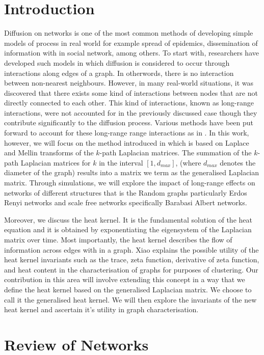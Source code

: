 \documentclass[10pt,a4paper]{article}
\theoremstyle{plain}
\theoremstyle{definition}
\begin{document}
	\newpage
	\section*{Introduction}
	Diffusion on networks is one of the most common methods of developing simple models of process in real world for example spread of epidemics, dissemination of information with in social network, among others. To start with, researchers have developed such models in which diffusion is considered to occur through interactions along edges of a graph. In otherwords, there is no interaction between non-nearest neighbours. However, in many real-world situations, it was discovered that there exists some kind of interactions between nodes that are not directly connected to each other. This kind of interactions, known as long-range interactions, were not accounted for in the previously discussed case though they contribute significantly to the diffusion process. Various methods have been put forward to account for these long-range range interactions as in . In this work, however, we will focus on the method introduced in \citep{estrada2012path,estrada2017long} which is based on Laplace and Mellin transforms of the $k$-path Laplacian matrices. The summation of the $k$-path Laplacian matrices for $k$ in the interval $[1,d_{max}]$, (where $d_{max}$ denotes the diameter of the graph) results into a matrix we term as the generalised Laplacian matrix.
	Through simulations, we will explore the impact of long-range effects on networks of different structures that is the Random graphs particularly Erdos Renyi networks and scale free networks specifically Barabasi Albert networks. 
	
	Moreover, we discuss the heat kernel. It is the fundamental solution of the heat equation and it is obtained by exponentiating the eigensystem of the Laplacian matrix over time. Most importantly, the heat kernel describes the flow of information across edges with in a graph. Xiao \citep{xiao2009graph} explains the possible utility of the heat kernel invariants such as the trace, zeta function, derivative of zeta function, and heat content in the characterisation of graphs for purposes of clustering. Our contribution in this area will involve extending this concept in a way that we define the heat kernel based on the generalised Laplacian matrix. We choose to call it the generalised heat kernel. We will then explore the invariants of the new heat kernel and ascertain it's utility in graph characterisation.
	\newpage
	\section{Review of Networks}
	
\end{document}
